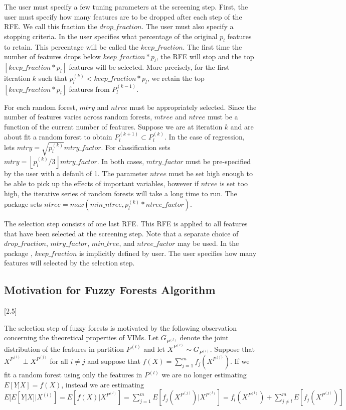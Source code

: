 \documentclass[article,shortnames]{jss}
\begin{document}
The user must specify a few tuning parameters at the screening step.  First, the user must specify how many features are to be dropped after 
each step of the RFE.  We call this fraction the $drop\_fraction$.   The user must also specify a stopping criteria. 
In  the user specifies what percentage of the original $p_{l}$ features to retain.  This percentage will be called the $keep\_fraction$.  
The first time the number of features drops below $keep\_fraction*p_{l}$, the RFE will stop and the top 
$\left\lfloor keep\_fraction*p_{l} \right\rfloor$ features will be selected.  More precisely, for the first iteration $k$ such that $p^{(k)}_{l}<keep\_fraction*p_{l}$, 
we retain the top $\left\lfloor keep\_fraction*p_{l} \right\rfloor$ features from $P_{l}^{(k-1)}$.         

For each random forest, $mtry$ and $ntree$ must be appropriately selected.  Since the number of features varies across random forests, $mtree$
and $ntree$ must be a function of the current number of features.   Suppose we are at iteration $k$ and are about fit a random forest to obtain
$P_{l}^{(k+1)}\subset P_{l}^{(k)}$.  In the case of regression,  lets $mtry=\sqrt{p^{(k)}_{l}}mtry\_factor$.  For classification 
 sets $mtry=\left\lfloor p^{(k)}_{l}/3 \right\rfloor mtry\_factor$.  In both cases, $mtry\_factor$ must be pre-specified by the user
with a default of 1.  The parameter $ntree$ must be set high enough to be able to pick up the effects
of important variables, however if $ntree$ is set too high, the iterative series of random forests will take a long time to run.  The package  sets $ntree=max(min\_ntree,p^{(k)}_{l}*ntree\_factor)$.
   
The selection step consists of one last RFE. This RFE is applied to all features that have
been selected at the screening step.  Note that a separate choice of $drop\_fraction$, $mtry\_factor$, $min\_tree$,
and $ntree\_factor$ may be used.  In the package , $keep\_fraction$ is implicitly defined by user.  The user specifies 
how many features will selected by the selection step.  

\subsection{Motivation for Fuzzy Forests Algorithm}[2.5]

The selection step of fuzzy forests is motivated by the following observation concerning the theoretical properties of VIMs. 
Let $G_{P^{(l)}}$ denote the joint distribution of the features in partition $P^{(l)}$ and let $X^{P^{(l)}} \sim G_{P^{(l)}}$.
Suppose that $X^{P^{(i)}} \perp X^{P^{(j)}}$ for all $i\neq j$ and suppose that $f(X)=\sum_{j=1}^{m}f_{j}(X^{P^{(j)}})$.  If we fit
a random forest using only the features in $P^{(l)}$ we are no longer estimating $E[Y|X]=f(X)$, instead we are estimating
 $E[E[Y|X]|X^{(l)}]=E[f(X)|X^{P^{(l)}}]=\sum_{j=1}^{m}E[f_{j}(X^{P^{(j)}})|X^{P^{(l)}}]=f_{l}(X^{P^{(l)}}) + \sum_{j\neq l}^{m}E[f_{j}(X^{P^{(j)}})]$
\end{document}
